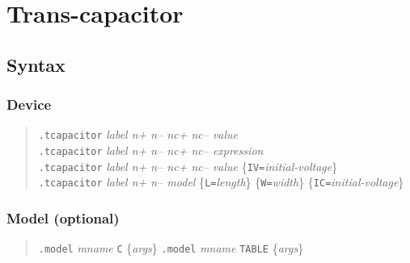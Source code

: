 %
%
%
%
\section{Trans-capacitor}
\subsection{Syntax}
\subsubsection{Device}
\begin{verse}
{\tt .tcapacitor} {\it label n+ n-- nc+ nc-- value}\\
{\tt .tcapacitor} {\it label n+ n-- nc+ nc-- expression}\\
{\tt .tcapacitor} {\it label n+ n-- nc+ nc-- value}
	\{{\tt IV=}{\it initial-voltage}\}\\
{\tt .tcapacitor} {\it label n+ n-- model} \{{\tt L=}{\it length}\}
	\{{\tt W=}{\it width}\} \{{\tt IC=}{\it initial-voltage}\}
\end{verse}
\subsubsection{Model (optional)}
\begin{verse}
{\tt .model} {\it mname} {\tt C} \{{\it args}\}
{\tt .model} {\it mname} {\tt TABLE} \{{\it args}\}
\end{verse}
